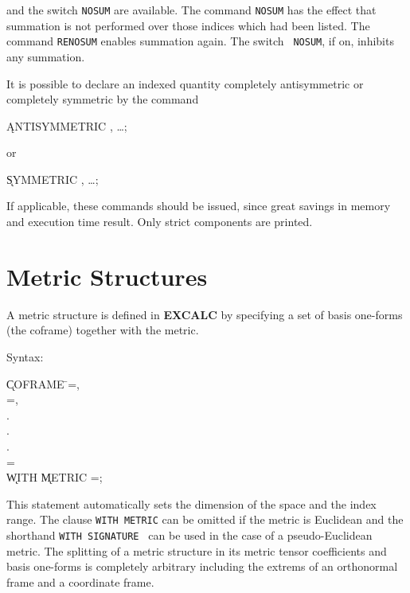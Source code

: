 and the switch {\tt NOSUM} are 
available.  The command {\tt NOSUM} has the effect that summation is
not performed over those indices which had been listed.  The command
{\tt RENOSUM}\label{RENOSUM} enables summation again.  The switch {\tt
NOSUM}, if on, inhibits any summation. 

It is possible to declare an indexed quantity completely antisymmetric
or completely symmetric by the command

\hspace*{2em} \k{ANTISYMMETRIC} , \ldots;\label{ANTISYMMETRIC}

or

\hspace*{2em} \k{SYMMETRIC} , \ldots;\label{SYMMETRIC}

If applicable, these commands should
be issued, since great savings in memory and execution time result.
Only strict components are printed.


\section{Metric Structures}

 
A metric structure is defined in {\bf EXCALC} by specifying a set of
basis one-forms (the coframe) together with the metric.

Syntax:\label{COFRAME}

\begin{tabbing}
\hspace*{2em} \k{COFRAME} \=
=, \\
\> =, \\
\> . \\
\> . \\
\> . \\
\> = \\
\> \hspace{1em} \k{WITH} \k{METRIC} =; \\
\end{tabbing}

 
This statement automatically sets the dimension of the space and the
index range. The clause {\tt WITH METRIC} can be omitted if the metric
is Euclidean and the shorthand {\tt WITH SIGNATURE }
\label{SIGNATURE} can be used in the case of a pseudo-Euclidean metric. The
splitting of a metric structure in its metric tensor coefficients and
basis one-forms is completely arbitrary including the extrems of an
orthonormal frame and a coordinate frame.

